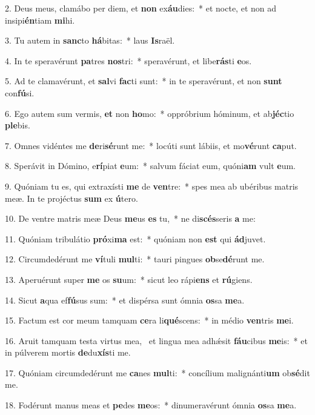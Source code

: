 2. Deus meus, clamábo per diem, et \textbf{non} ex\textbf{áu}dies:~*  et nocte, et non ad insipi\textbf{én}tiam \textbf{mi}hi.\

3. Tu autem in \textbf{sanc}to \textbf{há}bitas:~*  laus \textbf{Is}raël.\

4. In te speravérunt \textbf{pa}tres \textbf{nos}tri:~*  speravérunt, et libe\textbf{rás}ti \textbf{e}os.\

5. Ad te clamavérunt, et \textbf{sal}vi \textbf{fac}ti sunt:~*  in te speravérunt, et non \textbf{sunt} con\textbf{fú}si.\

6. Ego autem sum vermis, \textbf{et} non \textbf{ho}mo:~*  oppróbrium hóminum, et ab\textbf{jéc}tio \textbf{ple}bis.\

7. Omnes vidéntes me \textbf{de}ri\textbf{sé}runt me:~*  locúti sunt lábiis, et mo\textbf{vé}runt \textbf{ca}put.\

8. Sperávit in Dómino, e\textbf{rí}piat \textbf{e}um:~*  salvum fáciat eum, quóni\textbf{am} vult \textbf{e}um.\

9. Quóniam tu es, qui extraxísti \textbf{me} de \textbf{ven}tre:~*  spes mea ab ubéribus matris meæ. In te projéctus \textbf{sum} ex \textbf{ú}tero.\

10. De ventre matris meæ Deus \textbf{me}us \textbf{es} tu,~*  ne di\textbf{scés}seris \textbf{a} me:\

11. Quóniam tribulátio \textbf{pró}xi\textbf{ma} est:~*  quóniam non \textbf{est} qui \textbf{ád}juvet.\

12. Circumdedérunt me \textbf{ví}tuli \textbf{mul}ti:~*  tauri pingues \textbf{ob}se\textbf{dé}runt me.\

13. Aperuérunt super \textbf{me} os \textbf{su}um:~*  sicut leo rápi\textbf{ens} et \textbf{rú}giens.\

14. Sicut \textbf{a}qua ef\textbf{fú}sus sum:~*  et dispérsa sunt ómnia \textbf{os}sa \textbf{me}a.\

15. Factum est cor meum tamquam \textbf{ce}ra li\textbf{qué}scens:~*  in médio \textbf{ven}tris \textbf{me}i.\

16. Aruit tamquam testa virtus mea, \dag\  et lingua mea adhǽsit \textbf{fáu}cibus \textbf{me}is:~*  et in púlverem mortis \textbf{de}du\textbf{xís}ti me.\

17. Quóniam circumdedérunt me \textbf{ca}nes \textbf{mul}ti:~*  concílium malignánti\textbf{um} ob\textbf{sé}dit me.\

18. Fodérunt manus meas et \textbf{pe}des \textbf{me}os:~*  dinumeravérunt ómnia \textbf{os}sa \textbf{me}a.\

